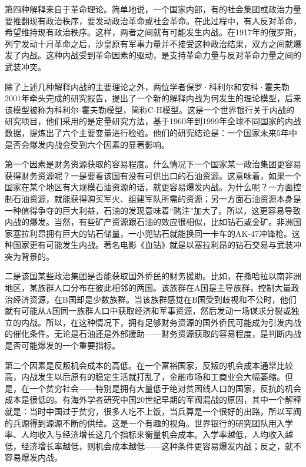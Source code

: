 第四种解释来自于革命理论。简单地说，一个国家内部，有的社会集团或政治力量要推翻现有政治秩序，要发动政治革命或社会革命。在此过程中，有人反对革命，希望维持现有政治秩序。这样，两者之间就有可能发生内战。在1917年的俄罗斯，列宁发动十月革命之后，沙皇原有军事力量并不接受这种政治结果，双方之间就爆发了内战。这种内战受到革命因素的驱动，是支持革命力量与反对革命力量之间的武装冲突。

除了上述几种解释内战的主要理论之外，两位学者保罗·科利尔和安科·霍夫勒2001年牵头完成的研究报告，提出了一个新的解释内战为何发生的理论模型，后来该模型被称为科利尔-霍夫勒模型，简称C-H模型。这是一个世界银行关于内战的研究项目，他们采用的是定量研究方法，基于1960年到1999年全球不同国家的内战数据，提炼出了六个主要变量进行检验。他们的研究结论是：一个国家未来5年中是否会爆发内战会受到六个因素的显著影响。

第一个因素是财务资源获取的容易程度。什么情况下一个国家某一政治集团更容易获得财务资源呢？一是要看该国有没有可供出口的石油资源。这意味着，如果一个国家在某个地区有大规模石油资源的话，就更容易爆发内战。为什么呢？一方面控制石油资源，就能获得购买军火、组建军队所需的资源；另一方面石油资源本身是一种值得争夺的巨大利益，石油的发现意味着“赌注”加大了。所以，这更容易导致内战的爆发。当然，有些矿产资源跟石油的效应很相似，比如钻石或金矿。非洲国家塞拉利昂拥有巨大的钻石储量，一小兜钻石就能换回一卡车的AK-47冲锋枪。这种国家更有可能发生内战。著名电影《血钻》就是以塞拉利昂的钻石交易与武装冲突为背景的。

二是该国某些政治集团是否能获取国外侨民的财务援助。比如，在撒哈拉以南非洲地区，某族群人口分布在彼此相邻的两国。该族群在A国是主导族群，控制大量政治经济资源，在B国却是少数族群。当该族群感觉在B国受到歧视和不公时，他们就有可能从A国同一族群人口中获取经济和军事资源，然后发动一场谋求分裂或独立的内战。所以，在这种情况下，拥有足够财务资源的国外侨民可能成为引发内战的催化条件。无论是石油还是外部援助——财务资源获取的容易程度，是判断内战是否可能爆发的一个重要指标。

第二个因素是反叛机会成本的高低。在一个富裕国家，反叛的机会成本通常比较高，内战发生以后原有的稳定生活就打乱了，金融市场和工商业会大幅萎缩。但是，在一个贫穷社会——特别是拥有大量低于绝对贫困线人口的国家，反抗的机会成本是很低的。有海外学者研究中国20世纪早期的军阀混战的原因，其中一个解释就是：当时中国过于贫穷，很多人吃不上饭，当兵算是一个很好的出路，所以军阀的兵源得到源源不断的供给。这是一个有趣的视角。世界银行的研究团队用入学率、人均收入与经济增长这几个指标来衡量机会成本。入学率越低，人均收入越低，经济增长率越低，则机会成本越低——这种条件更容易爆发内战；反之，就不容易爆发内战。

